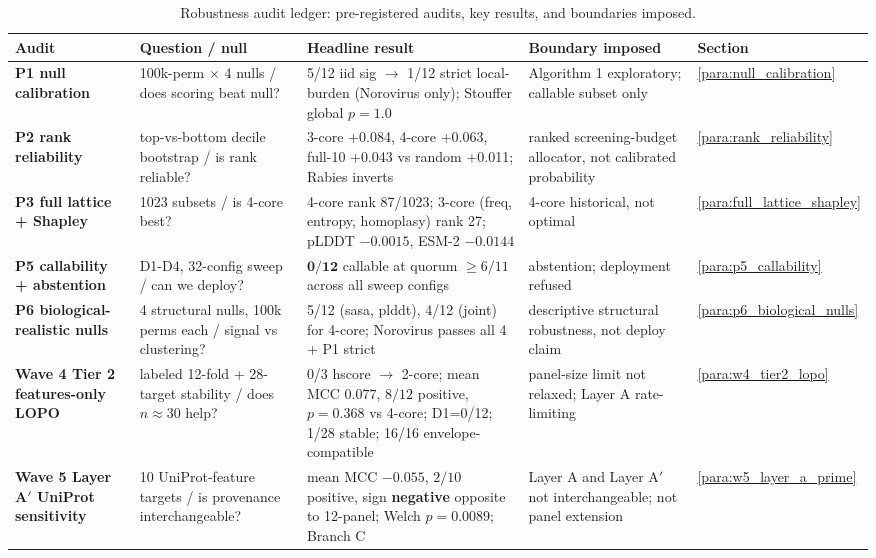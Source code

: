 \begin{table}[htbp]
\centering
\small
\fontsize{8.4}{9.2}\selectfont
\setlength{\tabcolsep}{1.5pt}
\renewcommand{\arraystretch}{0.92}
\caption{Robustness audit ledger: pre-registered audits, key results, and boundaries imposed.}
\label{tab:audit_ledger}
\begin{tabular}{p{}p{}p{}p{}p{}}
\toprule
\textbf{Audit} & \textbf{Question / null} & \textbf{Headline result} & \textbf{Boundary imposed} & \textbf{Section} \\
\midrule
\textbf{P1 null calibration} & 100k-perm $\times$ 4 nulls / does scoring beat null? & 5/12 iid sig $\to$ 1/12 strict local-burden (Norovirus only); Stouffer global $p=1.0$ & Algorithm 1 exploratory; callable subset only & \ref{para:null_calibration} \\
\textbf{P2 rank reliability} & top-vs-bottom decile bootstrap / is rank reliable? & 3-core +0.084, 4-core +0.063, full-10 +0.043 vs random +0.011; Rabies inverts & ranked screening-budget allocator, not calibrated probability & \ref{para:rank_reliability} \\
\textbf{P3 full lattice + Shapley} & 1023 subsets / is 4-core best? & 4-core rank 87/1023; 3-core (freq, entropy, homoplasy) rank 27; pLDDT $-0.0015$, ESM-2 $-0.0144$ & 4-core historical, not optimal & \ref{para:full_lattice_shapley} \\
\textbf{P5 callability + abstention} & D1-D4, 32-config sweep / can we deploy? & $\mathbf{0/12}$ callable at quorum $\geq 6/11$ across all sweep configs & abstention; deployment refused & \ref{para:p5_callability} \\
\textbf{P6 biological-realistic nulls} & 4 structural nulls, 100k perms each / signal vs clustering? & 5/12 (sasa, plddt), 4/12 (joint) for 4-core; Norovirus passes all 4 + P1 strict & descriptive structural robustness, not deploy claim & \ref{para:p6_biological_nulls} \\
\textbf{Wave 4 Tier 2 features-only LOPO} & labeled 12-fold + 28-target stability / does $n\approx30$ help? & 0/3 hscore $\to$ 2-core; mean MCC $0.077$, $8/12$ positive, $p=0.368$ vs 4-core; D1=0/12; 1/28 stable; 16/16 envelope-compatible & panel-size limit not relaxed; Layer A rate-limiting & \ref{para:w4_tier2_lopo} \\
\textbf{Wave 5 Layer A$'$ UniProt sensitivity} & 10 UniProt-feature targets / is provenance interchangeable? & mean MCC $-0.055$, $2/10$ positive, sign \textbf{negative} opposite to 12-panel; Welch $p=0.0089$; Branch C & Layer A and Layer A$'$ not interchangeable; not panel extension & \ref{para:w5_layer_a_prime} \\

\end{tabular}
\end{table}
